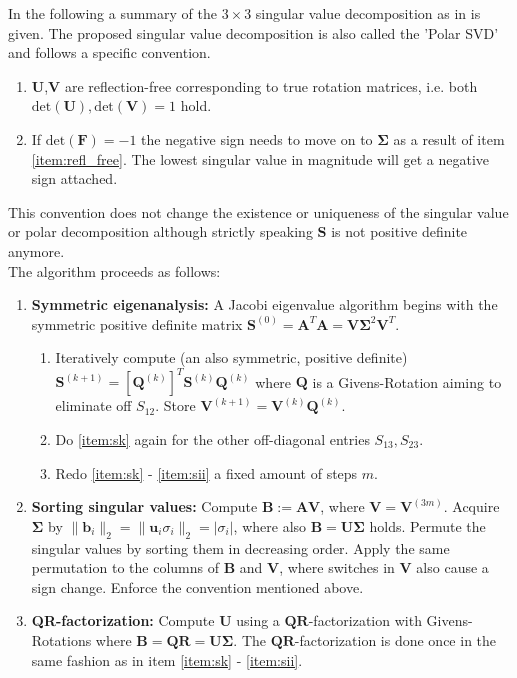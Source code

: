 \documentclass[m,times]{cgMA}
\begin{document}
In the following a summary of the $3 \times 3$ singular value decomposition as in \cite{SVD:3x3} is given. The proposed singular value decomposition is also called the 'Polar SVD' and follows a specific convention.
\begin{enumerate}\label{ref:itemize_conv}
  \item\label{item:refl_free} $\boldsymbol{U}$,$\boldsymbol{V}$ are reflection-free corresponding to true rotation matrices, i.e. both $\text{det}(\boldsymbol{U}), \text{det}(\boldsymbol{V}) = 1$ hold.
  \item If $\text{det}(\boldsymbol{F}) = -1$ the negative sign needs to move on to $\boldsymbol{\Sigma}$ as a result of item \ref{item:refl_free}. The lowest singular value in magnitude will get a negative sign attached.
  \end{enumerate}
This convention does not change the existence or uniqueness of the singular value or polar decomposition although strictly speaking $\boldsymbol{S}$ is not positive definite anymore.
\\
The algorithm proceeds as follows:
\begin{enumerate}
  \item \label{it:eig} \textbf{Symmetric eigenanalysis:} A Jacobi eigenvalue algorithm begins with the symmetric positive definite matrix $\boldsymbol { S } ^{(0)}= \boldsymbol { A } ^ { T } \boldsymbol { A } = \boldsymbol { V } \boldsymbol { \Sigma } ^ { 2 } \boldsymbol { V } ^ { T }$.
    \begin{enumerate}[label*=\arabic*.]
      \item \label{item:sk} Iteratively compute (an also symmetric, positive definite) $\boldsymbol { S } ^ { ( k + 1 ) } = [ \boldsymbol { Q } ^ { ( k )}] ^ { T } \boldsymbol { S } ^ { ( k ) } \boldsymbol { Q } ^ { ( k ) }$ where $\boldsymbol{Q}$ is a Givens-Rotation aiming to eliminate off $S_{12}$. Store $\boldsymbol{V}^{(k+1)} = \boldsymbol{V}^{(k)}  \boldsymbol{Q}^{(k)}$.
      \item \label{item:sii} Do \ref{item:sk} again for the other off-diagonal entries $S_{13},S_{23}$.
      \item \label{item:redo_sii} Redo \ref{item:sk} - \ref{item:sii} a fixed amount of steps $m$.
    \end{enumerate}
  \item \textbf{Sorting singular values:} Compute $\boldsymbol{B} := \boldsymbol{AV}$, where $\boldsymbol{V} = \boldsymbol{V}^{(3m)}$. Acquire $\boldsymbol{\Sigma}$ by $\|\boldsymbol{b}_i \|_2 = \|\boldsymbol{u}_i\sigma_i\|_2 = |\sigma_i|$, where also $\boldsymbol{B=U\Sigma}$ holds. Permute the singular values by sorting them in decreasing order. Apply the same permutation to the columns of $\boldsymbol{B}$ and $\boldsymbol{V}$, where switches in $\boldsymbol{V}$ also cause a sign change. Enforce the convention mentioned above.
  \item \label{item:qr} \textbf{QR-factorization:} Compute $\boldsymbol{U}$ using a $\boldsymbol{QR}$-factorization with Givens-Rotations where $\boldsymbol{B}=\boldsymbol{QR}=\boldsymbol{U\Sigma}$. The $\boldsymbol{QR}$-factorization is done once in the same fashion as in item \ref{item:sk} - \ref{item:sii}.
\end{enumerate}
\end{document}
